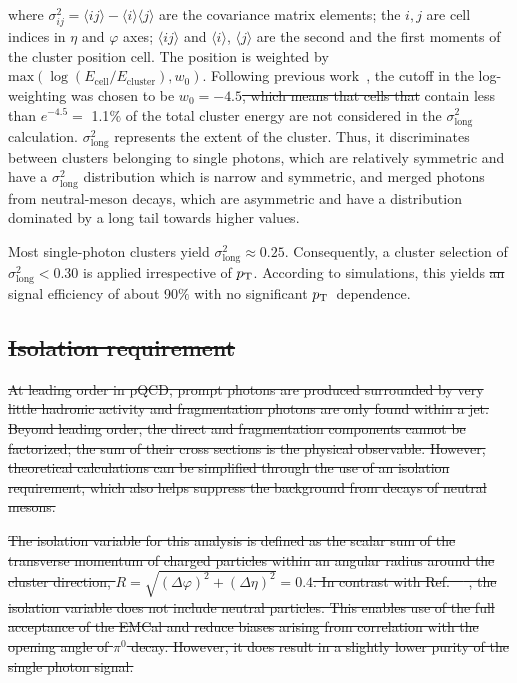 \documentclass[ALICE,manyauthors]{cernphprep}
\newcommand{\lambdasquare}{\ensuremath{\sigma^{2}_{\mathrm{long}}}}
\newcommand{\pt}           {\ensuremath{p_{\rm T}}\xspace}
\providecommand{\DIFaddtex}[1]{{\protect\color{blue}\uwave{#1}}} %
\providecommand{\DIFdeltex}[1]{{\protect\color{red}\sout{#1}}}                      %
\providecommand{\DIFaddbegin}{} %
\providecommand{\DIFaddend}{} %
\providecommand{\DIFdelbegin}{} %
\providecommand{\DIFdelend}{} %
\providecommand{\DIFadd}[1]{\texorpdfstring{\DIFaddtex{#1}}{#1}} %
\providecommand{\DIFdel}[1]{\texorpdfstring{\DIFdeltex{#1}}{}} %
\newcommand{\DIFscaledelfig}{0.5}
\newlength{\DIFdelgraphicswidth} %
\newlength{\DIFdelgraphicsheight} %
\newcommand{\DIFaddincludegraphics}[2][]{{\color{blue}\fbox{\DIFOincludegraphics[#1]{#2}}}} %
\newcommand{\DIFdelincludegraphics}[2][]{%
\sbox{\DIFdelgraphicsbox}{\DIFOincludegraphics[#1]{#2}}%
\settoboxwidth{\DIFdelgraphicswidth}{\DIFdelgraphicsbox} %
\settoboxtotalheight{\DIFdelgraphicsheight}{\DIFdelgraphicsbox} %
\scalebox{\DIFscaledelfig}{%
\parbox[b]{\DIFdelgraphicswidth}{\usebox{\DIFdelgraphicsbox}\\[-\baselineskip] \rule{\DIFdelgraphicswidth}{0em}}\llap{\resizebox{\DIFdelgraphicswidth}{\DIFdelgraphicsheight}{%
\setlength{\unitlength}{\DIFdelgraphicswidth}%
\begin{picture}(1,1)%
\thicklines\linethickness{2pt} %
{\color[rgb]{1,0,0}\put(0,0){\framebox(1,1){}}}%
{\color[rgb]{1,0,0}\put(0,0){\line( 1,1){1}}}%
{\color[rgb]{1,0,0}\put(0,1){\line(1,-1){1}}}%
\end{picture}%
}\hspace*{3pt}}} %
} %
\DeclareRobustCommand{\DIFaddbegin}{\DIFOaddbegin \let\includegraphics\DIFaddincludegraphics} %
\DeclareRobustCommand{\DIFaddend}{\DIFOaddend \let\includegraphics\DIFOincludegraphics} %
\DeclareRobustCommand{\DIFdelbegin}{\DIFOdelbegin \let\includegraphics\DIFdelincludegraphics} %
\DeclareRobustCommand{\DIFdelend}{\DIFOaddend \let\includegraphics\DIFOincludegraphics} %
\begin{document}
where $\sigma^{2}_{ij} = \langle ij \rangle - \langle i \rangle\langle j \rangle$ are the covariance matrix elements; the \DIFaddbegin \DIFadd{integers }\DIFaddend $i,j$ are cell indices in $\eta$ and  $\varphi$ axes; $\langle ij \rangle$ and $\langle i\rangle$, $\langle j\rangle$ are the second and the first moments of the cluster position cell. The position is weighted by $\mathrm{max}\left(\log(E_{\mathrm{cell}}/E_{\mathrm{cluster}}), w_{0}\right).$ Following previous work~\cite{Acharya:2018dqe}, the cutoff in the log-weighting was chosen to be $w_{0}=-4.5$\DIFdelbegin \DIFdel{, which means that cells that }\DIFdelend \DIFaddbegin \DIFadd{. Cells that }\DIFaddend contain less than {$e^{-4.5} =$ 1.1$\%$} of the total cluster energy are not considered in the $\lambdasquare$ calculation.
$\lambdasquare$ represents the extent of the cluster. Thus, it discriminates between clusters belonging to single photons, which are relatively symmetric and have a $\lambdasquare$ distribution which is narrow and symmetric, and merged photons from neutral-meson decays, which are asymmetric and have a distribution dominated by a long tail towards higher values. 

Most single-photon clusters yield $\lambdasquare\approx 0.25$. Consequently, a cluster selection of $\lambdasquare<0.30$ is applied irrespective of \pt. According to simulations, this yields \DIFdelbegin \DIFdel{an }\DIFdelend \DIFaddbegin \DIFadd{a }\DIFaddend signal efficiency of about 90$\%$ with no significant \pt~dependence.


\DIFdelbegin \subsection{\DIFdel{Isolation requirement}}
\addtocounter{subsection}{-1}%
\DIFdel{At leading order in pQCD, prompt photons are produced surrounded by very little hadronic activity and fragmentation photons are only found within a jet. Beyond leading order, the direct and fragmentation components 
cannot be factorized; the sum of their cross sections is the physical observable. However, theoretical calculations can be simplified through the use of an isolation requirement, which also helps suppress the background from decays of neutral mesons.
}%

\DIFdel{The isolation variable for this analysis is defined as the scalar sum of the transverse momentum of charged particles within an angular radius around the cluster direction, $R =\sqrt{(\Delta\varphi)^{2} +(\Delta\eta)^{2}  } =0.4$. In contrast with Ref.~\mbox{%
\cite{Acharya:2019jkx}}%
, the isolation variable does not include neutral particles. This enables use of the full acceptance of the EMCal and reduce biases arising from correlation with the opening angle of $\pi^{0}$ decay. However, it does result in a slightly lower purity of the single photon signal. 
}%
\end{document}
